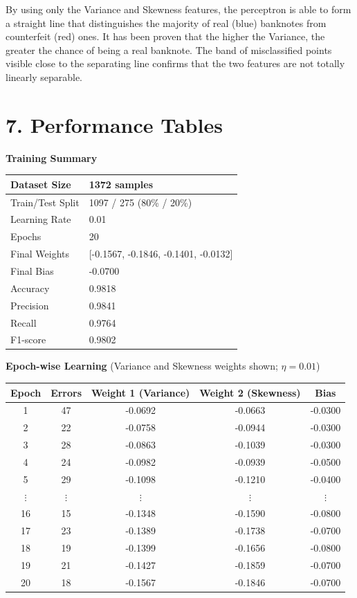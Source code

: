 \documentclass[11pt]{article}
\begin{document}
By using only the Variance and Skewness features, the perceptron is able to form a straight line that distinguishes the majority of real (blue) banknotes from counterfeit (red) ones. It has been proven that the higher the Variance, the greater the chance of being a real banknote. The band of misclassified points visible close to the separating line confirms that the two features are not totally linearly separable.


\section*{7. Performance Tables}

\textbf{Training Summary}

\begin{tabular}{|p{6cm}|p{7cm}|}
\hline
Dataset Size & 1372 samples\\
\hline
Train/Test Split & 1097 / 275 (80\% / 20\%)\\
\hline
Learning Rate & 0.01\\
\hline
Epochs & 20\\
\hline
Final Weights & [-0.1567, -0.1846, -0.1401, -0.0132]\\
\hline
Final Bias & -0.0700\\
\hline
Accuracy & 0.9818\\
\hline
Precision & 0.9841\\
\hline
Recall & 0.9764\\
\hline
F1-score & 0.9802\\
\hline
\end{tabular}

\vspace{3mm}

\textbf{Epoch-wise Learning} (Variance and Skewness weights shown; $\eta = 0.01$)

\begin{tabular}{|c|c|c|c|c|}
\hline
Epoch & Errors & Weight 1 (Variance) & Weight 2 (Skewness) & Bias\\
\hline
1 & 47 & -0.0692 & -0.0663 & -0.0300\\
2 & 22 & -0.0758 & -0.0944 & -0.0300\\
3 & 28 & -0.0863 & -0.1039 & -0.0300\\
4 & 24 & -0.0982 & -0.0939 & -0.0500\\
5 & 29 & -0.1098 & -0.1210 & -0.0400\\
$\vdots$ & $\vdots$ & $\vdots$ & $\vdots$ & $\vdots$\\
16 & 15 & -0.1348 & -0.1590 & -0.0800\\
17 & 23 & -0.1389 & -0.1738 & -0.0700\\
18 & 19 & -0.1399 & -0.1656 & -0.0800\\
19 & 21 & -0.1427 & -0.1859 & -0.0700\\
20 & 18 & -0.1567 & -0.1846 & -0.0700\\
\hline
\end{tabular}
\end{document}
